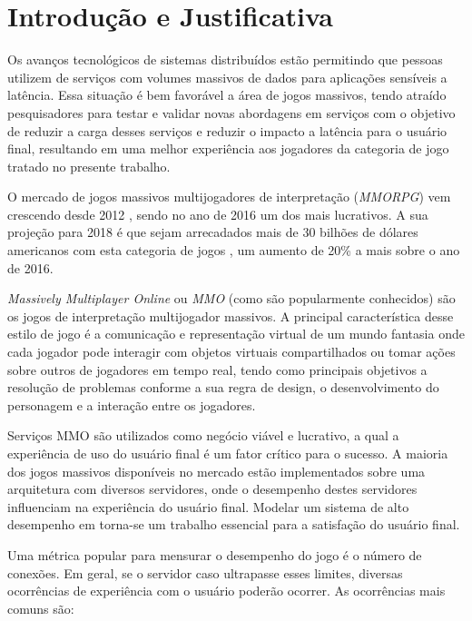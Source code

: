 \section{Introdução e Justificativa}
\label{sec:int}

Os avanços tecnológicos de sistemas distribuídos estão permitindo que pessoas utilizem de serviços com volumes massivos de dados para aplicações sensíveis a latência. Essa situação é bem favorável a área de jogos massivos, tendo atraído pesquisadores para testar e validar novas abordagens em serviços com o objetivo de reduzir a carga desses serviços e reduzir o impacto a latência para o usuário final, resultando em uma melhor experiência aos jogadores da categoria de jogo tratado no presente trabalho\cite{mmo_analytic}.

O mercado de jogos massivos multijogadores de interpretação (\textit{MMORPG}) vem crescendo desde 2012 \cite{new_york_times}, sendo no ano de 2016 um dos mais lucrativos\cite{statista_2016}. A sua projeção para 2018 é que sejam arrecadados mais de 30 bilhões de dólares americanos com esta categoria de jogos \cite{statista_2018}, um aumento de 20\% a mais sobre o ano de 2016.

\textit{Massively Multiplayer Online} ou \textit{MMO} (como são popularmente conhecidos) são os jogos de interpretação multijogador massivos. A principal característica desse estilo de jogo é a comunicação e representação virtual de um mundo fantasia onde cada jogador pode interagir com objetos virtuais compartilhados ou tomar ações sobre outros de jogadores em tempo real, tendo como principais objetivos a resolução de problemas conforme a sua regra de design, o desenvolvimento do personagem e a interação entre os jogadores\cite{video_game_technologies}.

Serviços MMO são utilizados como negócio viável e lucrativo, a qual a experiência de uso do usuário final é um fator crítico para o sucesso. A maioria dos jogos massivos disponíveis no mercado estão implementados sobre uma arquitetura com diversos servidores, onde o desempenho destes servidores influenciam na experiência do usuário final. Modelar um sistema de alto desempenho em torna-se um trabalho essencial para a satisfação do usuário final\cite{1417630}.

Uma métrica popular para mensurar o desempenho do jogo é o número de conexões. Em geral, se o servidor caso ultrapasse esses limites, diversas ocorrências de experiência com o usuário poderão ocorrer\cite{1417630}. As ocorrências mais comuns são:

